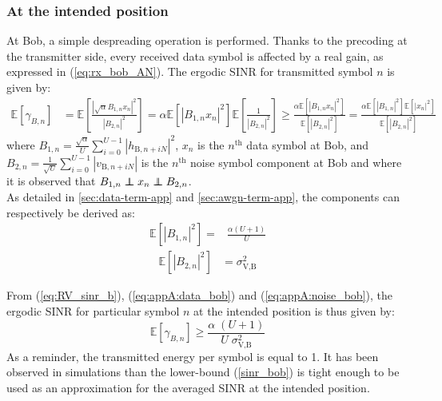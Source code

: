 \documentclass[12pt, draftclsnofoot, onecolumn]{IEEEtran}
\newcommand{\EX}[1]{\mathbb{E} \left[#1\right]}%
\newcommand\independent{\protect\mathpalette{\protect\independenT}{\perp}}
\def\independenT#1#2{\mathrel{\rlap{$#1#2$}\mkern2mu{#1#2}}}
\begin{document}
\subsubsection{At the intended position}
At Bob, a simple despreading operation is performed. Thanks to the precoding at the transmitter side, every received data symbol is affected by a real gain, as expressed in (\ref{eq:rx_bob_AN}). The ergodic SINR for transmitted symbol $n$ is given by:
\begin{equation}
\begin{split}
\EX{\gamma_{B,n}} &= \EX{ \frac{  \left| \sqrt{\alpha} B_{1,n} x_n \right|^2  }{  \left| B_{2,n} \right|^2} }  = \alpha \EX{\left| B_{1,n}  x_n\right|^2}  \EX{\frac{1}{\left| B_{2,n} \right|^2}}   \geq  \frac{\alpha \EX{  \left| B_{1,n}  x_n\right|^2 } }{\EX{ \left| B_{2,n} \right|^2 }} =  \frac{\alpha \EX{ \left|B_{1,n}  \right|^2 } \EX{ \left| x_n \right|^2 } }{\EX{ \left| B_{2,n} \right|^2 }}
\label{eq:RV_sinr_b}
\end{split}
\end{equation}
where $B_{1,n} = \frac{\sqrt{\alpha}}{U}\sum_{i=0}^{U-1} \left| h_{\text{B}, n + iN}\right|^2$, $x_n$ is the $n^{\text{th}}$ data symbol at Bob, and $B_{2,n} = \frac{1}{\sqrt{U}}\sum_{i=0}^{U-1} \left| v_{\text{B}, n + iN}\right|$ is the $n^{\text{th}}$ noise symbol component at Bob and where it is observed that $B_{1,n} \independent x_n \independent B_{2,n}$.\\
As detailed in \ref{sec:data-term-app} and \ref{sec:awgn-term-app}, the components can respectively be derived as:
\begin{equation}
	\begin{split}
	\EX{|B_{1,n}|^2} =& \frac{\alpha (U+1)}{U}
	\end{split}
	\label{eq:appA:data_bob}
\end{equation}
\begin{equation}
	\begin{split}
	\EX{|B_{2,n}|^2} &= \sigma^2_{\text{V,B}}
	\end{split}
	\label{eq:appA:noise_bob}
\end{equation}

From (\ref{eq:RV_sinr_b}), (\ref{eq:appA:data_bob}) and (\ref{eq:appA:noise_bob}), the ergodic SINR for particular symbol $n$ at the intended position is thus given by:
\begin{equation}
\EX{\gamma_{B,n}} \geq \frac{\alpha \;(U+1)}{U \; \sigma_{\text{V,B}}^2}
\label{sinr_bob}
\end{equation}
As a reminder, the transmitted energy per symbol is equal to 1. It has been observed in simulations than the lower-bound (\ref{sinr_bob}) is tight enough to be used as an approximation for the averaged SINR at the intended position. 
\end{document}
